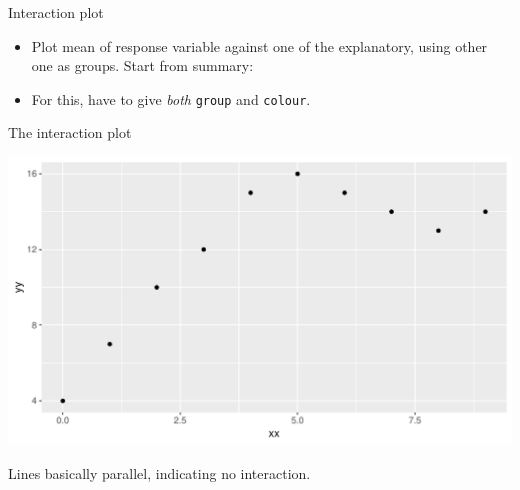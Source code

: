 \begin{frame}[fragile]{Interaction plot}
  
  \begin{itemize}
  \item Plot mean of response variable against one of the explanatory, using
    other one as groups. Start from summary:
    
\begin{knitrout}
\color{fgcolor}\begin{kframe}
\begin{alltt}
\hlkwb{=}\hlstd{(}
     \hlopt{+}
  \hlstd{()}\hlopt{+}\hlstd{()}
\end{alltt}
\end{kframe}
\end{knitrout}

\item For this, have to give \emph{both} \texttt{group} and \texttt{colour}.
  \end{itemize}
  
\end{frame}

\begin{frame}[fragile]{The interaction plot}
\begin{knitrout}
\color{fgcolor}\begin{kframe}
\begin{alltt}
\end{alltt}
\end{kframe}
\includegraphics[width=\maxwidth]{figure/unnamed-chunk-14-1} 

\end{knitrout}

Lines basically parallel, indicating no interaction.
\end{frame}

